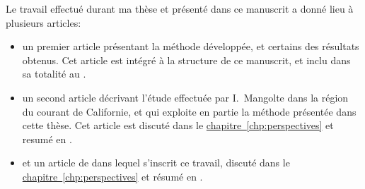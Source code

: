 \begingroup
\resetbegentry
{}
Le travail effectué durant ma thèse et présenté dans ce manuscrit a donné lieu à plusieurs articles:
\begin{itemize}
  \setlength{\itemsep}{1.8\onelineskip}
  \renewcommand*\labelitemi{\adfrightarrowhead}
  \item un premier article présentant la méthode développée, et certains des résultats obtenus.
        Cet article est intégré à la structure de ce manuscrit, et inclu dans sa totalité au .

  \item un second article décrivant l'étude effectuée par I.\ Mangolte dans la région du courant de Californie, et qui exploite en partie la méthode présentée dans cette thèse. Cet article est discuté dans le \hyperref[sec:CCE]{chapitre~\ref{chp:perspectives}} et resumé en .
        \textnote{\review{\articleCceTitle}}

  \item et un article de  dans lequel s’inscrit ce travail, discuté dans le \hyperref[sec:review]{chapitre~\ref{chp:perspectives}} et résumé en .
        \textnote{\review{\articleReviewTitle}}

\end{itemize}
\endgroup

\bigskip

